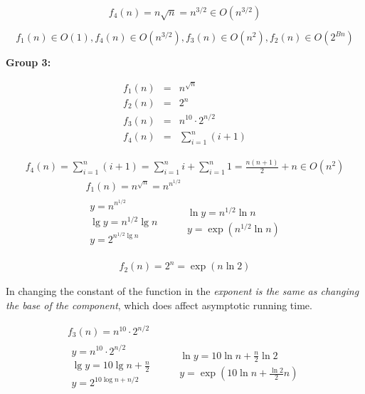 \documentclass[10pt]{amsart}
\begin{document}
\begin{multicols*}{2}
\[
f_4(n) = n \sqrt{n} = n^{3/2} \in O(n^{3/2})
\]

\[
\boxed{
f_1(n) \in O(1) , f_4(n) \in O(n^{3/2}), f_3(n) \in O(n^2) , f_2(n) \in O(2^{Bn})
}
\]


 \textbf{Group 3:}

$$
\begin{array}{rcl}
f_1(n) &=& n^{\sqrt{n}} \\
f_2(n) &=& 2^n \\
f_3(n) &=& n^{10} \cdot 2^{n / 2} \\
f_4(n) &=& \displaystyle\sum_{i = 1}^{n} (i + 1)
\end{array}
$$

\[
\begin{gathered}
	f_4(n) = \sum_{i=1}^n (i + 1) = \sum_{i=1}^n i + \sum_{i=1}^n 1 = \frac{n(n+1)}{2} + n \in O(n^2)
\end{gathered}
\]
\[
\begin{gathered}
	f_1(n) = n^{\sqrt{n}} = n^{n^{1/2}} \\
	\begin{gathered}
		y = n^{n^{1/2}} \\
		\lg{y} = n^{1/2} \lg{n} \\
	y = 2^{n^{1/2} \lg{n}}
	\end{gathered} \quad \quad \, \begin{gathered}
	\ln{y} = n^{1/2} \ln{n} \\ 
	y = \exp{ (n^{1/2} \ln{n})}
	\end{gathered}
\end{gathered}
\]

\[
\begin{gathered}
	f_2(n) = 2^n = \exp{(n\ln{2})}
\end{gathered}
\]

In changing the constant of the function in the \emph{exponent is the same as changing the base of the component}, which does affect asymptotic running time.

\[
\begin{gathered}
f_3(n) = n^{10} \cdot 2^{n/2} \\
\begin{gathered}
y = n^{10} \cdot 2^{n/2} \\
\lg{y} = 10 \lg{n} + \frac{n}{2} \\
y = 2^{10 \log{n} + n/2}
\end{gathered}
\quad \quad \, \begin{gathered}
\ln{y} = 10 \ln{n} + \frac{n}{2} \ln{2} \\
y = \exp{(10 \ln{n} + \frac{ \ln{2}}{2} n )}
\end{gathered}
\end{gathered}
\]


\end{multicols*}
\end{document}
